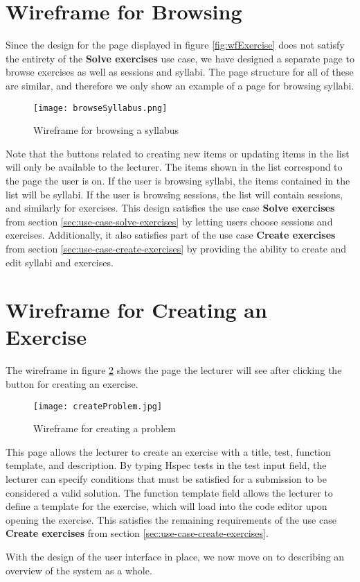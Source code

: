 \section{Wireframe for Browsing}
Since the design for the page displayed in figure \ref{fig:wfExercise} does not satisfy the entirety of the \textbf{Solve exercises} use case, we have designed a separate page to browse exercises as well as sessions and syllabi. The page structure for all of these are similar, and therefore we only show an example of a page for browsing syllabi.
\begin{figure}[H]
    \texttt{[image: browseSyllabus.png]}
    \centering
    \caption{Wireframe for browsing a syllabus}
    \label{fig:wfSyllabus}
\end{figure}
Note that the buttons related to creating new items or updating items in the list will only be available to the lecturer. The items shown in the list correspond to the page the user is on. If the user is browsing syllabi, the items contained in the list will be syllabi. If the user is browsing sessions, the list will contain sessions, and similarly for exercises. This design satisfies the use case \textbf{Solve exercises} from section \ref{sec:use-case-solve-exercises} by letting users choose sessions and exercises. Additionally, it also satisfies part of the use case \textbf{Create exercises} from section \ref{sec:use-case-create-exercises} by providing the ability to create and edit syllabi and exercises.

\section{Wireframe for Creating an Exercise}
The wireframe in figure \ref{fig:wfProblem} shows the page the lecturer will see after clicking the button for creating an exercise.
\begin{figure}[H]
	\texttt{[image: createProblem.jpg]}
	\centering
	\caption{Wireframe for creating a problem}
	\label{fig:wfProblem}
\end{figure}

This page allows the lecturer to create an exercise with a title, test, function template, and description.
By typing Hspec tests in the test input field, the lecturer can specify conditions that must be satisfied for a submission to be considered a valid solution.
The function template field allows the lecturer to define a template for the exercise, which will load into the code editor upon opening the exercise.
This satisfies the remaining requirements of the use case \textbf{Create exercises} from section \ref{sec:use-case-create-exercises}.

With the design of the user interface in place, we now move on to describing an overview of the system as a whole.
